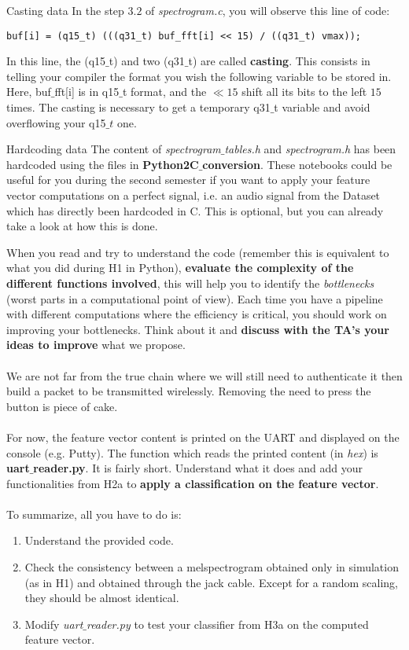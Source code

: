 \begin{bclogo}[couleur = gray!20, arrondi = 0.2, logo=\bcinfo]{Casting data}
%
In the step $3.2$ of \emph{spectrogram.c}, you will observe this line of code:
%
\begin{lstlisting}
buf[i] = (q15_t) (((q31_t) buf_fft[i] << 15) / ((q31_t) vmax));
\end{lstlisting}
%
In this line, the (q15$\_$t) and two (q31$\_$t) are called \textbf{casting}. This consists in telling your compiler the format you wish the following variable to be stored in. Here, buf$\_$fft[i] is in q15$\_$t format, and the $\ll 15$ shift all its bits to the left $15$ times. The casting is necessary to get a temporary q31$\_$t variable and avoid overflowing your q15$\_t$ one.
%
\end{bclogo}
%
\begin{bclogo}[couleur = gray!20, arrondi = 0.2, logo=\bcinfo]{Hardcoding data}
The content of \emph{spectrogram$\_$tables.h} and \emph{spectrogram.h} has been hardcoded using the files in \textbf{Python2C$\_$conversion}. These notebooks could be useful for you during the second semester if you want to apply your feature vector computations on a perfect signal, i.e. an audio signal from the Dataset which has directly been hardcoded in C. This is optional, but you can already take a look at how this is done.
\end{bclogo}
%
When you read and try to understand the code (remember this is equivalent to what you did during H1 in Python), \textbf{evaluate the complexity of the different functions involved}, this will help you to identify the \emph{bottlenecks} (worst parts in a computational point of view). Each time you have a pipeline with different computations where the efficiency is critical, you should work on improving your bottlenecks. Think about it and \textbf{discuss with the TA's your ideas to improve} what we propose. \\
\\
We are not far from the true chain where we will still need to authenticate it then build a packet to be transmitted wirelessly. Removing the need to press the button is piece of cake. \\
\\
For now, the feature vector content is printed on the UART and displayed on the console (e.g. Putty). The function which reads the printed content (in \emph{hex}) is \textbf{uart$\_$reader.py}. It is fairly short. Understand what it does and add your functionalities from H2a to \textbf{apply a classification on the feature vector}. \\
\\
%
\noindent To summarize, all you have to do is:
\begin{enumerate}
    \item Understand the provided code.
    \item Check the consistency between a melspectrogram obtained only in simulation (as in H1) and obtained through the jack cable. Except for a random scaling, they should be almost identical.
    \item Modify \emph{uart$\_$reader.py} to test your classifier from H3a on the computed feature vector.
\end{enumerate}
